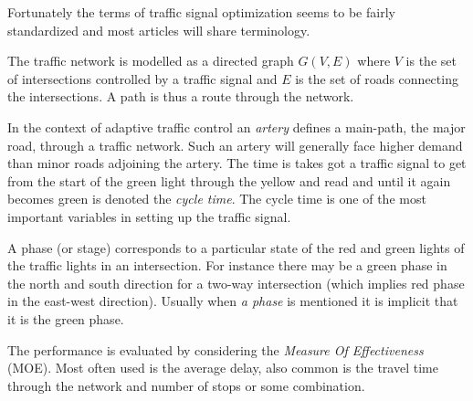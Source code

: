 \label{sec:vocabulary}

Fortunately the terms of traffic signal optimization seems to be
fairly standardized and most articles will share terminology.

The traffic network is modelled as a directed graph $G(V,E)$ where $V$
is the set of intersections controlled by a traffic signal and $E$ is
the set of roads connecting the intersections. A path is thus a route
through the network.

In the context of adaptive traffic control an {\em artery} defines a
main-path, the major road, through a traffic network. Such an artery will
generally face higher demand than minor roads adjoining the
artery. The time is takes got a traffic signal to get from the start
of the green light through the yellow and read and until it again
becomes green is denoted the {\em cycle time}. The cycle time is one
of the most important variables in setting up the traffic signal.

A phase (or stage) corresponds to a particular state of the red and
green lights of the traffic lights in an intersection. For instance
there may be a green phase in the north and south direction for a
two-way intersection (which implies red phase in the east-west
direction). Usually when \textit{a phase} is mentioned it is implicit
that it is the green phase.

The performance is evaluated by considering the {\em Measure Of
Effectiveness} (MOE). Most often used is the average delay, also
common is the travel time through the network and number of stops or
some combination.





